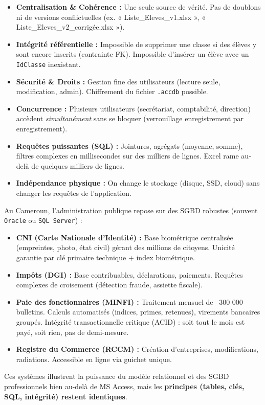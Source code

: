 \documentclass[11pt]{article}
\begin{document}
\begin{aretenir}
\begin{itemize}
    \item \textbf{Centralisation \& Cohérence :} Une seule source de vérité. Pas de doublons ni de versions conflictuelles (ex. « Liste\_Eleves\_v1.xlsx », « Liste\_Eleves\_v2\_corrigée.xlsx »).
    \item \textbf{Intégrité référentielle :} Impossible de supprimer une classe si des élèves y sont encore inscrits (contrainte FK). Impossible d'insérer un élève avec un \texttt{IdClasse} inexistant.
    \item \textbf{Sécurité \& Droits :} Gestion fine des utilisateurs (lecture seule, modification, admin). Chiffrement du fichier \texttt{.accdb} possible.
    \item \textbf{Concurrence :} Plusieurs utilisateurs (secrétariat, comptabilité, direction) accèdent \emph{simultanément} sans se bloquer (verrouillage enregistrement par enregistrement).
    \item \textbf{Requêtes puissantes (SQL) :} Jointures, agrégats (moyenne, somme), filtres complexes en millisecondes sur des milliers de lignes. Excel rame au-delà de quelques milliers de lignes.
    \item \textbf{Indépendance physique :} On change le stockage (disque, SSD, cloud) sans changer les requêtes de l'application.
\end{itemize}
\end{aretenir}

\begin{savaistu}
Au Cameroun, l'administration publique repose sur des SGBD robustes (souvent \texttt{Oracle} ou \texttt{SQL Server}) :
\begin{itemize}
    \item \textbf{CNI (Carte Nationale d'Identité) :} Base biométrique centralisée (empreintes, photo, état civil) gérant des millions de citoyens. Unicité garantie par clé primaire technique + index biométrique.
    \item \textbf{Impôts (DGI) :} Base contribuables, déclarations, paiements. Requêtes complexes de croisement (détection fraude, assiette fiscale).
    \item \textbf{Paie des fonctionnaires (MINFI) :} Traitement mensuel de ~300 000 bulletins. Calculs automatisés (indices, primes, retenues), virements bancaires groupés. Intégrité transactionnelle critique (ACID) : soit tout le mois est payé, soit rien, pas de demi-mesure.
    \item \textbf{Registre du Commerce (RCCM) :} Création d'entreprises, modifications, radiations. Accessible en ligne via guichet unique.
\end{itemize}
Ces systèmes illustrent la puissance du modèle relationnel et des SGBD professionnels bien au-delà de MS Access, mais les \textbf{principes (tables, clés, SQL, intégrité) restent identiques}.
\end{savaistu}
\end{document}
